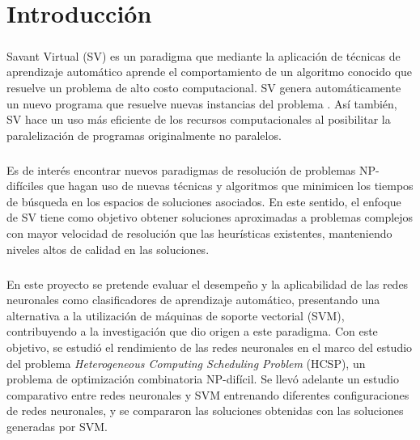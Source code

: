 \chapter{Introducción} \label{section-introduccion}

\paragraph{} Savant Virtual (SV) es un paradigma que mediante la aplicación de técnicas de aprendizaje automático aprende el comportamiento de un algoritmo conocido que resuelve un problema de alto costo computacional. SV genera automáticamente un nuevo programa que resuelve nuevas instancias del problema \cite{savant-original}.
Así también, SV hace un uso más eficiente de los recursos computacionales al posibilitar la paralelización de programas originalmente no paralelos.

\paragraph{} Es de interés encontrar nuevos paradigmas de resolución de problemas NP-difíciles que hagan uso de nuevas técnicas y algoritmos que minimicen los tiempos de búsqueda en los espacios de soluciones asociados.
En este sentido, el enfoque de SV tiene como objetivo obtener soluciones aproximadas a problemas complejos con mayor velocidad de resolución que las heurísticas existentes, manteniendo niveles altos de calidad en las soluciones. 

\paragraph{} En este proyecto se pretende evaluar el desempeño y la aplicabilidad de las redes neuronales como clasificadores de aprendizaje automático, presentando una alternativa a la utilización de máquinas de soporte vectorial (SVM), contribuyendo a la investigación que dio origen a este paradigma.
Con este objetivo, se estudió el rendimiento de las redes neuronales en el marco del estudio del problema \textit{Heterogeneous Computing Scheduling Problem} (HCSP), un problema de optimización combinatoria NP-difícil.
Se llevó adelante un estudio comparativo entre redes neuronales y SVM entrenando diferentes configuraciones de redes neuronales, y se compararon las soluciones obtenidas con las soluciones generadas por SVM. 

\newpage %

